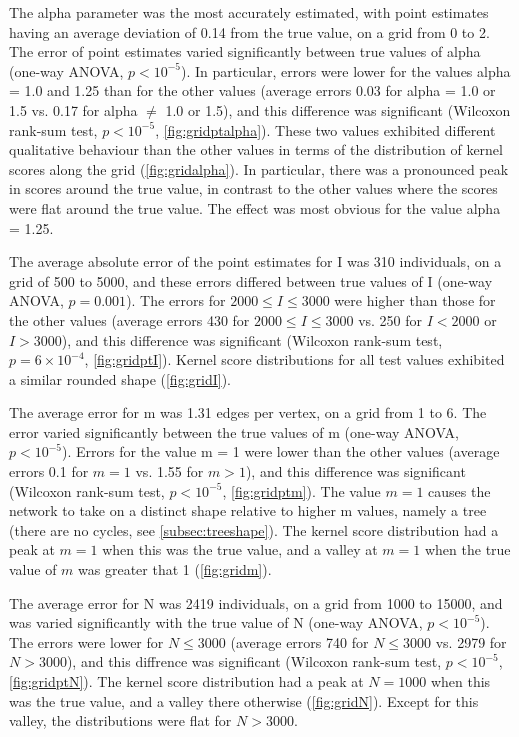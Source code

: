 The \gls{alpha} parameter was the most accurately estimated, with point
estimates having an average deviation of 
    0.14
from the true value, on a grid from 0 to 2. The error of point estimates varied
significantly between true values of \gls{alpha}
    (one-way \gls{ANOVA}, $p {<}10^{-5}$). In
particular, errors were lower for the values \gls{alpha} = 1.0 and 1.25 than
for the other values
    (average errors 
    0.03
    for \gls{alpha} = 1.0 or 1.5 vs.
    0.17
    for \gls{alpha} $\neq$ 1.0 or 1.5),
and this difference was significant
    (Wilcoxon rank-sum test, $p {<}10^{-5}$,
     \cref{fig:gridptalpha}).
These two values exhibited different qualitative behaviour than the other
values in terms of the distribution of kernel scores along the grid
(\cref{fig:gridalpha}). In particular, there was a pronounced peak in scores
around the true value, in contrast to the other values where the scores were
flat around the true value. The effect was most obvious for the value
\gls{alpha} = 1.25.

The average absolute error of the point estimates for \gls{I} was 
    310 individuals,
on a grid of 500 to 5000, and these errors differed between true values of
\gls{I}
    (one-way \gls{ANOVA}, $p =0.001$).
The errors for $2000 \leq I \leq 3000$ were higher than those for the other
values
    (average errors
     430
     for $2000 \leq I \leq 3000$ vs.
     250
     for $I < 2000$ or $I > 3000$),
and this difference was significant
    (Wilcoxon rank-sum test, $p =6\!\times\!10^{-4}$,
     \cref{fig:gridptI}).
Kernel score distributions for all test values exhibited a similar rounded
shape (\cref{fig:gridI}). 

The average error for \gls{m} was
    1.31 edges per vertex,
on a grid from 1 to 6. The error varied significantly between the true values
of \gls{m} 
    (one-way \gls{ANOVA}, $p {<}10^{-5}$).
Errors for the value \gls{m} = 1 were lower than the other values
    (average errors
    0.1
    for $m = 1$ vs.
    1.55
    for $m > 1$),
and this difference was significant
    (Wilcoxon rank-sum test, $p {<}10^{-5}$,
     \cref{fig:gridptm}).
The value $m = 1$ causes the network to take on a distinct shape relative to
higher \gls{m} values, namely a tree (\ie there are no cycles, see
\cref{subsec:treeshape}). The kernel score distribution had a peak at $m = 1$
when this was the true value, and a valley at $m = 1$ when the true value of
$m$ was greater that 1 (\cref{fig:gridm}).

The average error for \gls{N} was 
    2419 individuals,
on a grid from 1000 to 15000, and was varied significantly with the true value
of \gls{N}
    (one-way \gls{ANOVA}, $p {<}10^{-5}$).
The errors were lower for $N \leq 3000$
    (average errors
     740
     for $N \leq 3000$ vs.
     2979
     for $N > 3000$),
and this diffrence was significant
    (Wilcoxon rank-sum test, $p {<}10^{-5}$,
     \cref{fig:gridptN}).
The kernel score distribution had a peak at $N = 1000$ when this was the true
value, and a valley there otherwise (\cref{fig:gridN}). Except for this valley,
the distributions were flat for $N > 3000$.

